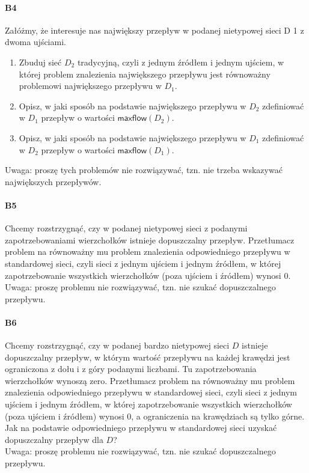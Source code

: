 \paragraph{B4} Załóżmy, że interesuje nas największy przepływ w podanej nietypowej sieci D 1 z dwoma ujściami.
\begin{enumerate}[label=\alph*)]
\item Zbuduj sieć $D_2$ tradycyjną, czyli z jednym źródłem i jednym ujściem, w której problem znalezienia największego przepływu jest równoważny problemowi największego przepływu w $D_1$.
\item Opisz, w jaki sposób na podstawie największego przepływu w $D_2$ zdefiniować w $D_1$ przepływ o wartości $\mathsf{maxflow}(D_2)$.
\item Opisz, w jaki sposób na podstawie największego przepływu w $D_1$ zdefiniować w $D_2$ przepływ o wartości $\mathsf{maxflow}(D_1)$.
\end{enumerate}
Uwaga: proszę tych problemów nie rozwiązywać, tzn. nie trzeba wskazywać największych przepływów.

\paragraph{B5} Chcemy rozstrzygnąć, czy w podanej nietypowej sieci z podanymi zapotrzebowaniami wierzchołków istnieje dopuszczalny przepływ. Przetłumacz problem na równoważny mu problem znalezienia odpowiedniego przepływu w standardowej sieci, czyli sieci z jednym ujściem i jednym źródłem, w której zapotrzebowanie wszystkich wierzchołków (poza ujściem i źródłem) wynosi 0.
Uwaga: proszę problemu nie rozwiązywać, tzn. nie szukać dopuszczalnego przepływu.

\paragraph{B6} Chcemy rozstrzygnąć, czy w podanej bardzo nietypowej sieci $D$ istnieje dopuszczalny przepływ, w którym wartość przepływu na każdej krawędzi jest ograniczona z dołu i z góry podanymi liczbami. Tu zapotrzebowania wierzchołków wynoszą zero. Przetłumacz problem na równoważny mu problem znalezienia odpowiedniego przepływu w standardowej sieci, czyli sieci z jednym ujściem i jednym źródłem, w której zapotrzebowanie wszystkich wierzchołków (poza ujściem i źródłem) wynosi 0, a ograniczenia na krawędziach są tylko górne. Jak na podstawie odpowiedniego przepływu w standardowej sieci uzyskać dopuszczalny przepływ dla $D$?\\
Uwaga: proszę problemu nie rozwiązywać, tzn. nie szukać dopuszczalnego przepływu.

